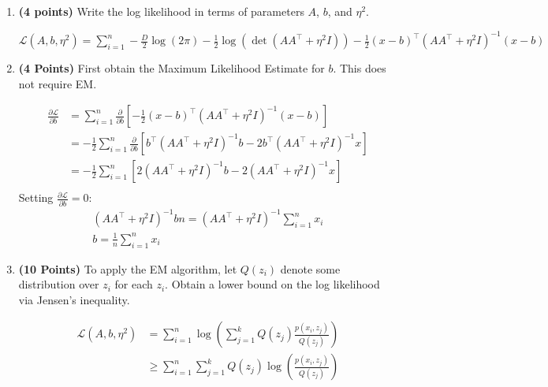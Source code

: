 \begin{enumerate}
\item \textbf{(4 points)}
Write the log likelihood in terms of parameters $A$, $b$, and $\eta^2$.

\begin{soln}
  $\mathcal{L}(A, b, \eta^2) = \sum_{i=1}^{n} -\frac{D}{2} \log(2 \pi) -\frac{1}{2} \log(\det(AA^\top + \eta^2 I)) -\frac{1}{2} (x-b)^\top (AA^\top + \eta^2 I)^{-1} (x-b)$
\end{soln}

\item \textbf{(4 Points)}
First obtain the Maximum Likelihood Estimate for $b$. This does not require EM.

\begin{soln}
  $$
  \begin{aligned}
    \frac{\partial \mathcal{L}}{\partial b} & = \sum_{i=1}^{n} \frac{\partial}{\partial b} \left[-\frac{1}{2} (x-b)^\top (AA^\top + \eta^2 I)^{-1} (x-b)\right] \\
    & = -\frac{1}{2} \sum_{i=1}^{n} \frac{\partial}{\partial b} \left[b^\top (AA^\top + \eta^2 I)^{-1} b - 2b^\top(AA^\top + \eta^2 I)^{-1}x \right] \\
    & = -\frac{1}{2} \sum_{i=1}^{n} \left[2 (AA^\top + \eta^2 I)^{-1} b - 2(AA^\top + \eta^2 I)^{-1}x \right] \\
  \end{aligned}
  $$
  Setting $\frac{\partial \mathcal{L}}{\partial b} = 0$:
  \begin{gather*}
    (AA^\top + \eta^2 I)^{-1} bn = (AA^\top + \eta^2 I)^{-1} \sum_{i=1}^{n} x_i \\
    b = \frac{1}{n} \sum_{i=1}^{n} x_i
  \end{gather*}
\end{soln}

\item \textbf{(10 Points)}
To apply the EM algorithm,
let $Q(z_i)$  denote some distribution over $z_i$ for each $z_i$.
Obtain a lower bound on the log likelihood via Jensen's inequality.

\begin{soln}
  $$
  \begin{aligned}
    \mathcal{L}(A, b, \eta^2) & = \sum_{i=1}^{n} \log\left(\sum_{j=1}^{k} Q(z_j) \frac{p(x_i, z_j)}{Q(z_j)} \right) \\
    & \geq \sum_{i=1}^{n} \sum_{j=1}^{k} Q(z_j) \log\left(\frac{p(x_i, z_j)}{Q(z_j)}\right)
  \end{aligned}
  $$
\end{soln}


\end{enumerate}
